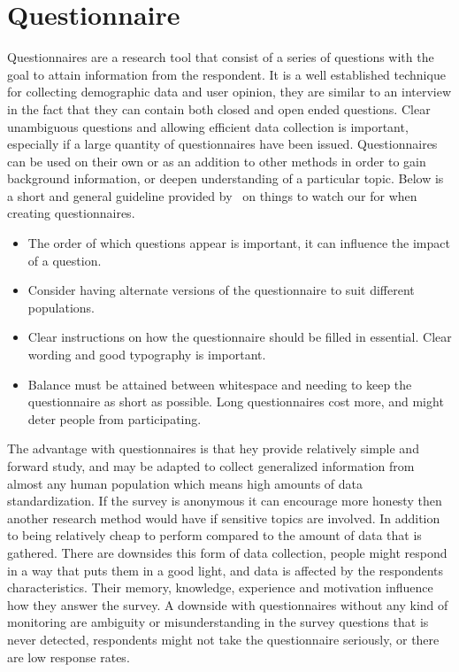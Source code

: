 \section{Questionnaire}
Questionnaires are a research tool that consist of a series of questions with the goal to attain information from the respondent. It is a well established technique for collecting demographic data and user opinion, they are similar to an interview in the fact that they can contain both closed and open ended questions. Clear unambiguous questions and allowing efficient data collection is important, especially if a large quantity of questionnaires have been issued. Questionnaires can be used on their own or as an addition to other methods in order to gain background information, or deepen understanding of a particular topic. Below is a short and general guideline provided by~\cite{interactionDesign} on things to watch our for when creating questionnaires.

\begin{itemize}
  \item The order of which questions appear is important, it can influence the impact of a question.
  \item Consider having alternate versions of the questionnaire to suit different populations.
  \item Clear instructions on how the questionnaire should be filled in essential. Clear wording and good typography is important.
  \item Balance must be attained between whitespace and needing to keep the questionnaire as short as possible. Long questionnaires cost more, and might deter people from participating.
\end{itemize}

The advantage with questionnaires is that hey provide relatively simple and forward study, and may be adapted to collect generalized information from almost any human population which means high amounts of data standardization. If the survey is anonymous it can encourage more honesty then another research method would have if sensitive topics are involved. In addition to being relatively cheap to perform compared to the amount of data that is gathered. There are downsides this form of data collection, people might respond in a way that puts them in a good light, and data is affected by the respondents characteristics. Their memory, knowledge, experience and motivation influence how they answer the survey. A downside with questionnaires without any kind of monitoring are ambiguity or misunderstanding in the survey questions that is never detected, respondents might not take the questionnaire seriously, or there are low response rates.

